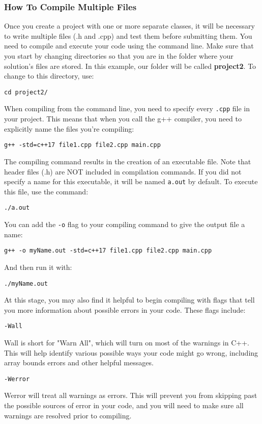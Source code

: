 \subsubsection{How To Compile Multiple Files}

Once you create a project with one or more separate classes, it will be necessary to write multiple files (.h and .cpp) and test them before submitting them. You need to compile and execute your code using the command line. Make sure that you start by changing directories so that you are in the folder where your solution’s files are stored. In this example, our folder will be called \textbf{project2}. To change to this directory, use:

\texttt{cd project2/}

When compiling from the command line, you need to specify every \texttt{.cpp} file in your project. This means that when you call the g++ compiler, you need to explicitly name the files you’re compiling:

\texttt{g++ -std=c++17 file1.cpp file2.cpp main.cpp}

The compiling command results in the creation of an executable file. Note that header files (.h) are NOT included in compilation commands. If you did not specify a name for this executable, it will be named \texttt{a.out} by default. To execute this file, use the command:

\texttt{./a.out}

You can add the \texttt{-o} flag to your compiling command to give the output file a name:

\texttt{g++ -o myName.out -std=c++17 file1.cpp file2.cpp main.cpp}

And then run it with:

\texttt{./myName.out}

At this stage, you may also find it helpful to begin compiling with flags that tell you more information about possible errors in your code. These flags include:

\texttt{-Wall}

Wall is short for "Warn All", which will turn on most of the warnings in C++. This will help identify various possible ways your code might go wrong, including array bounds errors and other helpful messages.

\texttt{-Werror}

Werror will treat all warnings as errors. This will prevent you from skipping past the possible sources of error in your code, and you will need to make sure all warnings are resolved prior to compiling.

